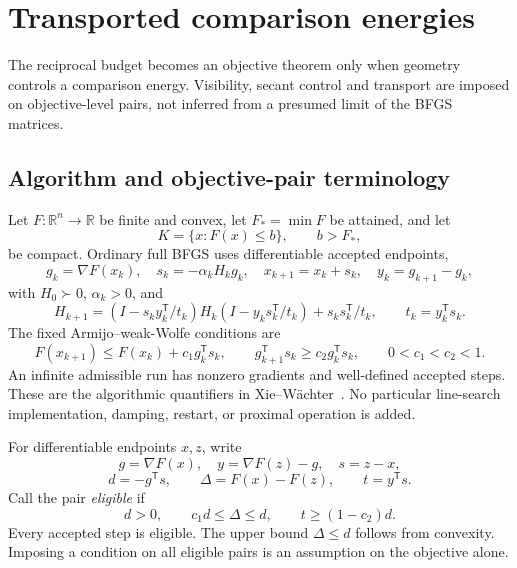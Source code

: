 \chapter{Transported comparison energies}\label{comp:T}\label{T:chapter}
\renewcommand{\ModuleTag}{3}
The reciprocal budget becomes an objective theorem only when geometry controls a comparison energy. Visibility, secant control and transport are imposed on objective-level pairs, not inferred from a presumed limit of the BFGS matrices.


\begingroup
\providecommand{\R}{}
\renewcommand{\R}{\mathbb R}
\providecommand{\tr}{}
\renewcommand{\tr}{\operatorname{tr}}
\providecommand{\diag}{}
\renewcommand{\diag}{\operatorname{diag}}
\providecommand{\Span}{}
\renewcommand{\Span}{\operatorname{span}}
\providecommand{\ip}{}
\renewcommand{\ip}[2]{\langle #1,#2\rangle}
\providecommand{\norm}{}
\renewcommand{\norm}[1]{\lVert #1\rVert}
\providecommand{\T}{}
\renewcommand{\T}{^{\mathsf T}}
\providecommand{\D}{}
\renewcommand{\D}{\mathcal D}
\setcounter{section}{1}
\setcounter{theorem}{0}
\setcounter{lemma}{0}
\setcounter{corollary}{0}
\setcounter{proposition}{0}
\setcounter{remark}{0}
\setcounter{equation}{2}


\section{Algorithm and objective-pair terminology}
Let $F:\R^n\to\R$ be finite and convex, let $F_*=\min F$ be attained, and let
\[
 K=\{x:F(x)\le b\},\qquad b>F_*,
\]
be compact. Ordinary full BFGS uses differentiable accepted endpoints,
\[
 g_k=\nabla F(x_k),\quad s_k=-\alpha_kH_kg_k,\quad
 x_{k+1}=x_k+s_k,\quad y_k=g_{k+1}-g_k,
\]
with $H_0\succ0$, $\alpha_k>0$, and
\[
 H_{k+1}=(I-s_ky_k\T/t_k)H_k(I-y_ks_k\T/t_k)+s_ks_k\T/t_k,
 \qquad t_k=y_k\T s_k.
\]
The fixed Armijo--weak-Wolfe conditions are
\[
 F(x_{k+1})\le F(x_k)+c_1g_k\T s_k,\qquad
 g_{k+1}\T s_k\ge c_2g_k\T s_k,\qquad 0<c_1<c_2<1.
\]
An infinite admissible run has nonzero gradients and well-defined accepted steps. These are the algorithmic quantifiers in Xie--W\"achter~\cite{XW}. No particular line-search implementation, damping, restart, or proximal operation is added.

For differentiable endpoints $x,z$, write
\[
 g=\nabla F(x),\quad y=\nabla F(z)-g,\quad s=z-x,
\]
\[
 d=-g\T s,\qquad \Delta=F(x)-F(z),\qquad t=y\T s.
\]
Call the pair \emph{eligible} if
\begin{equation}
 d>0,\qquad c_1d\le\Delta\le d,\qquad t\ge(1-c_2)d. \tag{3.2}
\end{equation}
Every accepted step is eligible. The upper bound $\Delta\le d$ follows from convexity. Imposing a condition on all eligible pairs is an assumption on the objective alone.

